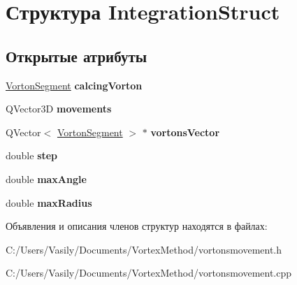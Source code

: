 \hypertarget{struct_integration_struct}{}\section{Структура Integration\+Struct}
\label{struct_integration_struct}
\subsection*{Открытые атрибуты}
\begin{DoxyCompactItemize}
\item 
\mbox{\label{struct_integration_struct_ace0e70231d7dfb1ce60f9b5eec4c7964}} 
\mbox{\hyperlink{class_vorton_segment}{Vorton\+Segment}} {\bfseries calcing\+Vorton}
\item 
\mbox{\label{struct_integration_struct_a1c8ac2cee11b571149d6b6f15596f068}} 
Q\+Vector3D {\bfseries movements}
\item 
\mbox{\label{struct_integration_struct_ab92d1ad9a3819e2e2f8c549a43eb2ec1}} 
Q\+Vector$<$ \mbox{\hyperlink{class_vorton_segment}{Vorton\+Segment}} $>$ $\ast$ {\bfseries vortons\+Vector}
\item 
\mbox{\label{struct_integration_struct_a629c0ddab4d9340be26279a9882434b9}} 
double {\bfseries step}
\item 
\mbox{\label{struct_integration_struct_ad13b1732a69ba3f5b988b015be8c8f61}} 
double {\bfseries max\+Angle}
\item 
\mbox{\label{struct_integration_struct_a5608063a443989f09a6e0915f3525fde}} 
double {\bfseries max\+Radius}
\end{DoxyCompactItemize}


Объявления и описания членов структур находятся в файлах\+:\begin{DoxyCompactItemize}
\item 
C\+:/\+Users/\+Vasily/\+Documents/\+Vortex\+Method/vortonsmovement.\+h\item 
C\+:/\+Users/\+Vasily/\+Documents/\+Vortex\+Method/vortonsmovement.\+cpp\end{DoxyCompactItemize}
